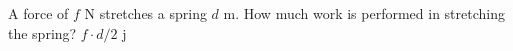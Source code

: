 {A force of $f$ N stretches a spring $d$ m. How much work is performed in stretching the spring?}
{$f\cdot d/2$ j}
